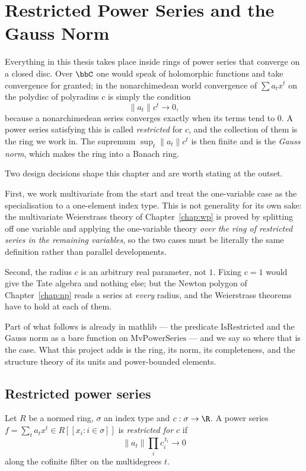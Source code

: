 \chapter{Restricted Power Series and the Gauss Norm}
\label{chap:rps}

Everything in this thesis takes place inside rings of power series that converge on a closed
disc.  Over $\bbC$ one would speak of holomorphic functions and take convergence for granted;
in the nonarchimedean world convergence of $\sum a_t x^t$ on the polydisc of polyradius $c$ is
simply the condition
\[
  \lVert a_t \rVert c^t \longrightarrow 0,
\]
because a nonarchimedean series converges exactly when its terms tend to $0$.  A power series
satisfying this is called \emph{restricted} for $c$, and the collection of them is the ring we
work in.  The supremum $\sup_t \lVert a_t\rVert c^t$ is then finite and is the \emph{Gauss
norm}, which makes the ring into a Banach ring.

Two design decisions shape this chapter and are worth stating at the outset.

First, we work multivariate from the start and treat the one-variable case as the specialisation
to a one-element index type.  This is not generality for its own sake: the multivariate
Weierstrass theory of Chapter~\ref{chap:wp} is proved by splitting off one variable and applying
the one-variable theory \emph{over the ring of restricted series in the remaining variables}, so
the two cases must be literally the same definition rather than parallel developments.

Second, the radius $c$ is an arbitrary real parameter, not $1$.  Fixing $c = 1$ would give the
Tate algebra and nothing else; but the Newton polygon of Chapter~\ref{chap:np} reads a series at
\emph{every} radius, and the Weierstrass theorems have to hold at each of them.

Part of what follows is already in mathlib --- the predicate $\mathrm{IsRestricted}$ and the
Gauss norm as a bare function on $\mathrm{MvPowerSeries}$ --- and we say so where that is the
case.  What this project adds is the ring, its norm, its completeness, and the structure theory
of its units and power-bounded elements.

\section{Restricted power series}

\begin{definition}
  \label{def:isrestricted}
  \leanok
  Let $R$ be a normed ring, $\sigma$ an index type and $c : \sigma \to \R$.  A power series
  $f = \sum_t a_t x^t \in R[[x_i : i \in \sigma]]$ is \emph{restricted for $c$} if
  \[
    \lVert a_t \rVert \prod_{i} c_i^{\,t_i} \longrightarrow 0
  \]
  along the cofinite filter on the multidegrees $t$.
\end{definition}

